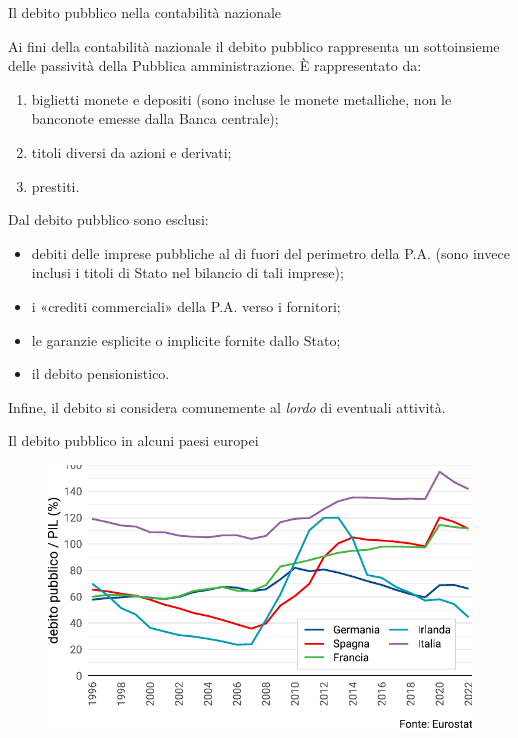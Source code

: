 \documentclass[aspectratio=64,11pt]{beamer}
\begin{document}
\begin{frame}{Il debito pubblico nella contabilità nazionale}

  Ai fini della contabilità nazionale il debito pubblico rappresenta un
  sottoinsieme delle passività della Pubblica amministrazione. È rappresentato da:
  \begin{enumerate}
  \item biglietti monete e depositi (sono incluse le monete metalliche, non le
    banconote emesse dalla Banca centrale);
  \item titoli diversi da azioni e derivati;
  \item prestiti.
  \end{enumerate}
  Dal debito pubblico sono esclusi:
  \begin{itemize}
  \item debiti delle imprese pubbliche al di fuori del perimetro della
    P.A. (sono invece inclusi i titoli di Stato nel bilancio di tali imprese);
  \item i «crediti commerciali» della P.A. verso i fornitori;
  \item le garanzie esplicite o implicite fornite dallo Stato;
  \item il debito pensionistico.
\end{itemize}
Infine, il debito si considera comunemente al \emph{lordo} di eventuali
attività.
\end{frame}

\begin{frame}{Il debito pubblico in alcuni paesi europei}
  
  \begin{figure}
    \centering
    \includegraphics[width=.9\textwidth]{./figure/debito-eu-color.pdf}
  \end{figure}
\end{frame}
\end{document}
